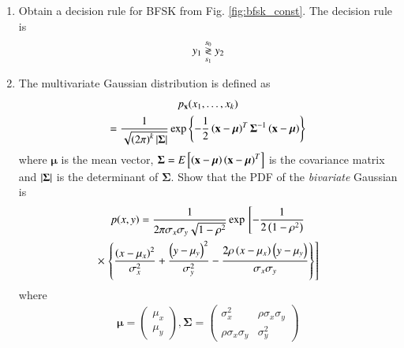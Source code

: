 \documentclass[journal,12pt,twocolumn]{IEEEtran}
\renewcommand\thesection{\arabic{section}}
\begin{document}
\begin{enumerate}[label=\thesection.\arabic*.,ref=\thesection.\theenumi]
\item
Obtain a decision rule for BFSK from Fig. \ref{fig:bfsk_const}.
\solution The decision rule is
\begin{equation}
\label{eq:bfsk_dec}
y_1 \overset{s_0}{\underset{s_1}{\gtrless}} y_2
\end{equation}
\item The multivariate Gaussian distribution is defined as
%
\begin{multline}
\label{eq:multivariate}
p_{\mathbf{x}}(x_1,\dots,x_k)
\\
=\frac{1}{\sqrt{\left(2\pi\right)^k\left\vert\bm{\Sigma}\right\vert}}\exp\left\{-\frac{1}{2}\left(\mathbf{x}-\bm{\mu}\right)^T\bm{\Sigma}^{-1}\left(\mathbf{x}-\bm{\mu}\right)\right\}
\end{multline}
%
where $\bm{\mu}$ is the mean vector, $\bm{\Sigma} = E{}\left[\left(\mathbf{x}-\bm{\mu}\right)\left(\mathbf{x}-\bm{\mu}\right)^T\right]$ is the covariance matrix and $\left\vert\bm{\Sigma}\right\vert$ is the determinant of $\bm{\Sigma}$.
Show that the PDF of the {\em bivariate} Gaussian is
{\small
\begin{multline}
\label{eq:bivariate}
p(x,y)= \frac{1}{2\pi \sigma_x\sigma_y\sqrt{1-\rho^2}}\exp{}\left[-\frac{1}{2\left(1-\rho^2\right)}\right.
\\
\times {}\left.\left\{\frac{\left(x-\mu_x\right)^2}{\sigma_x^2}+\frac{\left(y-\mu_y\right)^2}{\sigma_y^2}-\frac{2\rho\left(x-\mu_x\right)\left(y-\mu_y\right)}{\sigma_x\sigma_y}\right\}\right]
\end{multline}
}
%
where
%
\begin{align}
\bm{\mu}=
\begin{pmatrix*}
\mu_x \\
\mu_y
\end{pmatrix*},
\bm{\Sigma} = 
\begin{pmatrix*}%
\sigma_x^2 & \rho\sigma_x\sigma_y \\
\rho\sigma_x\sigma_y & \sigma_y^2
\end{pmatrix*}
\end{align}
%
%

\end{enumerate}
\end{document}
